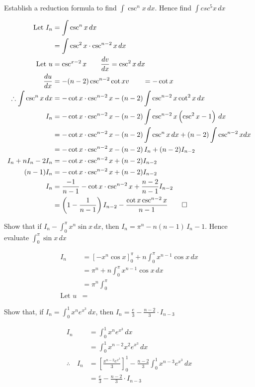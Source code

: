 \documentclass{standalone}
\begin{document}
	\begin{example}
		Establish a reduction formula to find $\int \csc^nx \, dx$. Hence find $\int csc^5x \, dx$
	\end{example}


	\begin{align*}
		\text{Let } I_n &= \int \csc^nx \, dx\\
		&= \int \csc^2x \cdot \csc^{n-2}x \, dx\\
		\text{Let } u & = \csc^{x-2} x              \qquad \frac{dv}{dx} = \csc^2x \, dx \\
		\frac{du}{dx}     & = -(n-2)\csc^{n-2}\cot x  v \qquad = -\cot x                 \\
		\therefore \int \csc^nx \, dx &= -\cot x \cdot \csc^{n-2}x  - (n-2)\int \csc^{n-2}x\cot^2x \, dx\\
		I_n &= 	-\cot x \cdot \csc^{n-2}x - (n-2)\int \csc^{n-2}x\left(\csc^2x - 1\right) \, dx\\
		&= 		-\cot x \cdot \csc^{n-2}x - (n-2)\int \csc^{n}x\,dx + (n-2)\int\csc^{n-2}xdx\\
		&=-\cot x \cdot \csc^{n-2}x  - (n-2)\, I_n + (n-2)I_{n-2}\\
		I_n + nI_n -2I_n &= -\cot x\cdot \csc^{n-2}x  + (n-2)I_{n-2}\\
		(n-1)I_n &= -\cot x\cdot \csc^{n-2}x  + (n-2)I_{n-2}\\
		I_n &= \frac{-1}{n-1}-\cot x\cdot \csc^{n-2}x + \frac{n-2}{n-1}I_{n-2}\\
		&= \left(1-\frac{1}{n-1}\right)I_{n-2}-\frac{\cot x\csc^{n-2}x}{n-1}\qed
	\end{align*}
	\begin{example}
		Show that if $I_n - \int_0^\pi x^n\sin x\,dx$, then $I_n = \pi^n - n(n-1)\,I_n-1$. Hence evaluate $\int_0^\pi\sin x\,dx$
	\end{example}
	\begin{align*}
		I_n &=\left[-x^n\cos x\right]_0^\pi + n\int_0^\pi x^{n-1} \cos x \, dx\\
		&=\pi^n + n\int_0^\pi x^{n-1} \cos x \, dx\\
		&= \pi^n \int_0^\pi \\
		\text {Let } u &=
	\end{align*}
	\begin{example}
		Show that, if $I_n = \int_0^1 x^n e^{x^3} \, dx$, then $I_n =\frac{e}{3} - \frac{n-2}{3} \cdot I_{n-3}$
	\end{example}
	
	\begin{align*}
		I_n &= \int_0^1 x^n e^{x^3} \, dx\\
		&= \int_0^1 x^{n-2}x^2e^{x^3} \, dx\\
		\therefore \quad I_n &= \left[\frac{x^{n-2}e^{x^3}}3\right]_0^1 - \frac{n-2}3 \int_0^1 x^{n-3}{e^{x^3}} \, dx\\
		&= \frac{e}3 - \frac{n-2}3 \cdot I_{n-3}
	\end{align*}
	
\end{document}
